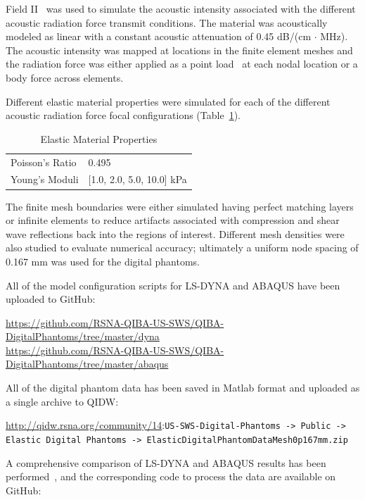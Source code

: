 Field II~\cite{Jensen1992} was used to simulate the acoustic intensity
associated with the different acoustic radiation force transmit conditions.
The material was acoustically modeled as linear with a constant acoustic
attenuation of 0.45 dB/(cm $\cdot$ MHz).  The acoustic intensity was mapped at
locations in the finite element meshes and the radiation force was either
applied as a point load~\cite{Palmeri2005} at each nodal location or a body
force across elements.

Different elastic material properties were simulated for each of the different
acoustic radiation force focal configurations (Table~\ref{table:elastic}).

\begin{table}[htb!]
    \centering
    \caption{Elastic Material Properties}
    \begin{tabular}{|l|l|}
    \hline
    Poisson's Ratio & 0.495 \\
    Young's Moduli &  [1.0, 2.0, 5.0, 10.0] kPa \\
    \hline
    \end{tabular}
\label{table:elastic}
\end{table}

The finite mesh boundaries were either simulated having perfect matching layers
or infinite elements to reduce artifacts associated with compression and shear
wave reflections back into the regions of interest.  Different mesh densities
were also studied to evaluate numerical accuracy; ultimately a uniform node
spacing of 0.167 mm was used for the digital phantoms.

All of the model configuration scripts for LS-DYNA and ABAQUS have been uploaded to GitHub:

\url{https://github.com/RSNA-QIBA-US-SWS/QIBA-DigitalPhantoms/tree/master/dyna}\\
\url{https://github.com/RSNA-QIBA-US-SWS/QIBA-DigitalPhantoms/tree/master/abaqus}

All of the digital phantom data has been saved in Matlab format and uploaded as
a single archive to QIDW:

\url{http://qidw.rsna.org/community/14}:\verb+US-SWS-Digital-Phantoms -> Public ->+\\
\verb+Elastic Digital Phantoms -> ElasticDigitalPhantomDataMesh0p167mm.zip+

A comprehensive comparison of LS-DYNA and ABAQUS results has been
performed~\cite{Bernal2011}, and the corresponding code to process the data are
available on GitHub:

